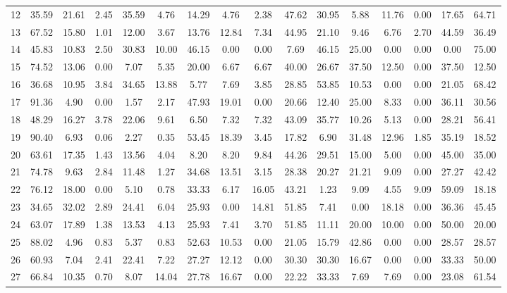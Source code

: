 \documentclass[12pt,authoryear]{elsarticle}
\begin{document}
\begin{table}[]
{\begin{tabular}{|c |c  c  c  c  c | c  c  c  c   c | c  c  c  c  c |}
  12 & 35.59 & 21.61 & 2.45 & 35.59 &  4.76 & 14.29 &  4.76 &  2.38 & 47.62 & 30.95 &  5.88 & 11.76 &  0.00 & 17.65 & 64.71 \\ 
  13 & 67.52 & 15.80 & 1.01 & 12.00 &  3.67 & 13.76 & 12.84 &  7.34 & 44.95 & 21.10 &  9.46 &  6.76 &  2.70 & 44.59 & 36.49 \\ 
  14 & 45.83 & 10.83 & 2.50 & 30.83 & 10.00 & 46.15 &  0.00 &  0.00 &  7.69 & 46.15 & 25.00 &  0.00 &  0.00 &  0.00 & 75.00 \\ 
  15 & 74.52 & 13.06 & 0.00 &  7.07 &  5.35 & 20.00 &  6.67 &  6.67 & 40.00 & 26.67 & 37.50 & 12.50 &  0.00 & 37.50 & 12.50 \\ 
  16 & 36.68 & 10.95 & 3.84 & 34.65 & 13.88 &  5.77 &  7.69 &  3.85 & 28.85 & 53.85 & 10.53 &  0.00 &  0.00 & 21.05 & 68.42 \\ 
  17 & 91.36 &  4.90 & 0.00 &  1.57 &  2.17 & 47.93 & 19.01 &  0.00 & 20.66 & 12.40 & 25.00 &  8.33 &  0.00 & 36.11 & 30.56 \\ 
  18 & 48.29 & 16.27 & 3.78 & 22.06 &  9.61 &  6.50 &  7.32 &  7.32 & 43.09 & 35.77 & 10.26 &  5.13 &  0.00 & 28.21 & 56.41 \\ 
  19 & 90.40 &  6.93 & 0.06 &  2.27 &  0.35 & 53.45 & 18.39 &  3.45 & 17.82 &  6.90 & 31.48 & 12.96 &  1.85 & 35.19 & 18.52 \\ 
  20 & 63.61 & 17.35 & 1.43 & 13.56 &  4.04 &  8.20 &  8.20 &  9.84 & 44.26 & 29.51 & 15.00 &  5.00 &  0.00 & 45.00 & 35.00 \\ 
  21 & 74.78 &  9.63 & 2.84 & 11.48 &  1.27 & 34.68 & 13.51 &  3.15 & 28.38 & 20.27 & 21.21 &  9.09 &  0.00 & 27.27 & 42.42 \\ 
  22 & 76.12 & 18.00 & 0.00 &  5.10 &  0.78 & 33.33 &  6.17 & 16.05 & 43.21 &  1.23 &  9.09 &  4.55 &  9.09 & 59.09 & 18.18 \\ 
  23 & 34.65 & 32.02 & 2.89 & 24.41 &  6.04 & 25.93 &  0.00 & 14.81 & 51.85 &  7.41 &  0.00 & 18.18 &  0.00 & 36.36 & 45.45 \\ 
  24 & 63.07 & 17.89 & 1.38 & 13.53 &  4.13 & 25.93 &  7.41 &  3.70 & 51.85 & 11.11 & 20.00 & 10.00 &  0.00 & 50.00 & 20.00 \\ 
  25 & 88.02 &  4.96 & 0.83 &  5.37 &  0.83 & 52.63 & 10.53 &  0.00 & 21.05 & 15.79 & 42.86 &  0.00 &  0.00 & 28.57 & 28.57 \\ 
  26 & 60.93 &  7.04 & 2.41 & 22.41 &  7.22 & 27.27 & 12.12 &  0.00 & 30.30 & 30.30 & 16.67 &  0.00 &  0.00 & 33.33 & 50.00 \\ 
  27 & 66.84 & 10.35 & 0.70 &  8.07 & 14.04 & 27.78 & 16.67 &  0.00 & 22.22 & 33.33 &  7.69 &  7.69 &  0.00 & 23.08 & 61.54 \\ 

\end{tabular}}
\end{table}
\end{document}
